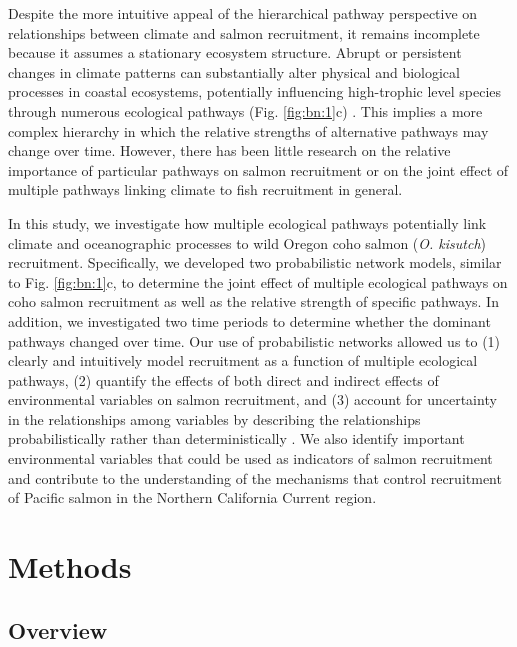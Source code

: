 Despite the more intuitive appeal of the hierarchical pathway perspective on
relationships between climate and salmon recruitment, it remains incomplete
because it assumes a stationary ecosystem structure.  Abrupt or persistent
changes in climate patterns can substantially alter physical and biological
processes in coastal ecosystems, potentially influencing high-trophic level
species through numerous ecological pathways (Fig. \ref{fig:bn:1}c)
\citep{Anderson1999a, Mantua1997a}. This implies a more complex hierarchy in
which the relative strengths of alternative pathways may change over time.
However, there has been little research on the relative importance of particular
pathways on salmon recruitment or on the joint effect of multiple pathways
linking climate to fish recruitment in general.

In this study, we investigate how multiple ecological pathways potentially link
climate and oceanographic processes to wild Oregon coho salmon (\emph{O.
kisutch}) recruitment. Specifically, we developed two probabilistic network
models, similar to Fig. \ref{fig:bn:1}c, to determine the joint effect of
multiple ecological pathways on coho salmon recruitment as well as the relative
strength of specific pathways. In addition, we investigated two time periods to
determine whether the dominant pathways changed over time. Our use of
probabilistic networks allowed us to (1) clearly and intuitively model
recruitment as a function of multiple ecological pathways, (2) quantify the
effects of both direct and indirect effects of environmental variables on salmon
recruitment, and (3) account for uncertainty in the relationships among
variables by describing the relationships probabilistically rather than
deterministically \citep{Varis1995a}. We also identify important environmental
variables that could be used as indicators of salmon recruitment and contribute
to the understanding of the mechanisms that control recruitment of Pacific
salmon in the Northern California Current region.



\section{Methods}

\subsection{Overview}

